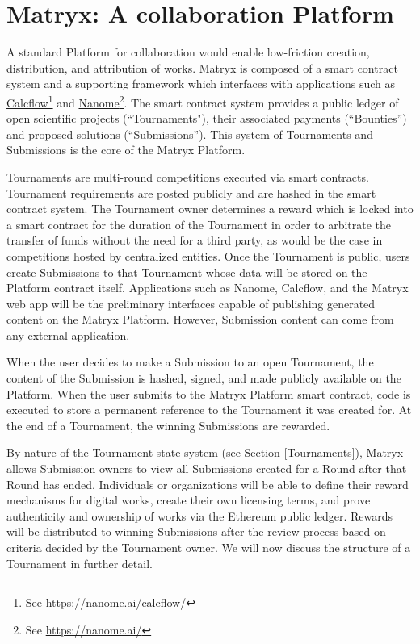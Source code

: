 \documentclass[a4paper, 10pt, conference]{ieeeconf}      %
\begin{document}
\section{Matryx: A collaboration Platform}
\label{matryx::acollaborationPlatform}
A standard Platform for collaboration would enable low-friction creation, distribution, and attribution of works. 
Matryx is composed of a smart contract system and a supporting framework which interfaces with applications such as \href{https://nanome.ai/calcflow/}{Calcflow}\footnote{See \href{https://nanome.ai/calcflow/}{https://nanome.ai/calcflow/}} and \href{https://nanome.ai/}{Nanome}\footnote{See \href{https://nanome.ai/}{https://nanome.ai/}}. 
The smart contract system provides a public ledger of open scientific projects (``Tournaments"), their associated payments (``Bounties”) and proposed solutions (``Submissions”). 
This system of Tournaments and Submissions is the core of the Matryx Platform.

Tournaments are multi-round competitions executed via smart contracts. 
Tournament requirements are posted publicly and are hashed in the smart contract system. 
The Tournament owner determines a reward which is locked into a smart contract for the duration of the Tournament in order to arbitrate the transfer of funds without the need for a third party, as would be the case in competitions hosted by centralized entities.
Once the Tournament is public, users create Submissions to that Tournament whose data will be stored on the Platform contract itself.
Applications such as Nanome, Calcflow, and the Matryx web app will be the preliminary interfaces capable of publishing generated content on the Matryx Platform. However, Submission content can come from any external application.

When the user decides to make a Submission to an open Tournament, the content of the Submission is hashed, signed, and made publicly available on the Platform.
When the user submits to the Matryx Platform smart contract, code is executed to store a permanent reference to the Tournament it was created for.
At the end of a Tournament, the winning Submissions are rewarded.

By nature of the Tournament state system  (see Section \ref{Tournaments}), Matryx allows Submission owners to view all Submissions created for a Round after that Round has ended.
Individuals or organizations will be able to define their reward mechanisms for digital works, create their own licensing terms, and prove authenticity and ownership of works via the Ethereum public ledger. 
Rewards will be distributed to winning Submissions after the review process based on criteria decided by the Tournament owner. We will now discuss the structure of a Tournament in further detail.
\end{document}
